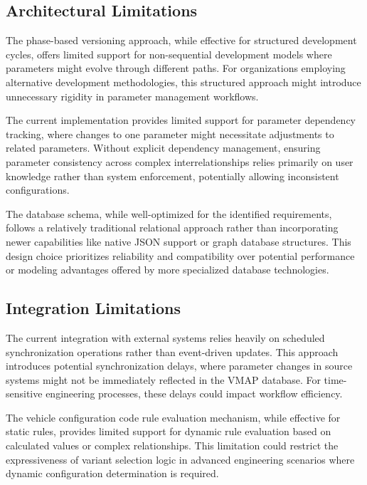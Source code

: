 \subsection{Architectural Limitations}
\label{subsec:architectural-limitations}

The phase-based versioning approach, while effective for structured development cycles, offers limited support for non-sequential development models where parameters might evolve through different paths. For organizations employing alternative development methodologies, this structured approach might introduce unnecessary rigidity in parameter management workflows.

The current implementation provides limited support for parameter dependency tracking, where changes to one parameter might necessitate adjustments to related parameters. Without explicit dependency management, ensuring parameter consistency across complex interrelationships relies primarily on user knowledge rather than system enforcement, potentially allowing inconsistent configurations.

The database schema, while well-optimized for the identified requirements, follows a relatively traditional relational approach rather than incorporating newer capabilities like native JSON support or graph database structures. This design choice prioritizes reliability and compatibility over potential performance or modeling advantages offered by more specialized database technologies.

\subsection{Integration Limitations}
\label{subsec:integration-limitations}

The current integration with external systems relies heavily on scheduled synchronization operations rather than event-driven updates. This approach introduces potential synchronization delays, where parameter changes in source systems might not be immediately reflected in the VMAP database. For time-sensitive engineering processes, these delays could impact workflow efficiency.

The vehicle configuration code rule evaluation mechanism, while effective for static rules, provides limited support for dynamic rule evaluation based on calculated values or complex relationships. This limitation could restrict the expressiveness of variant selection logic in advanced engineering scenarios where dynamic configuration determination is required.

